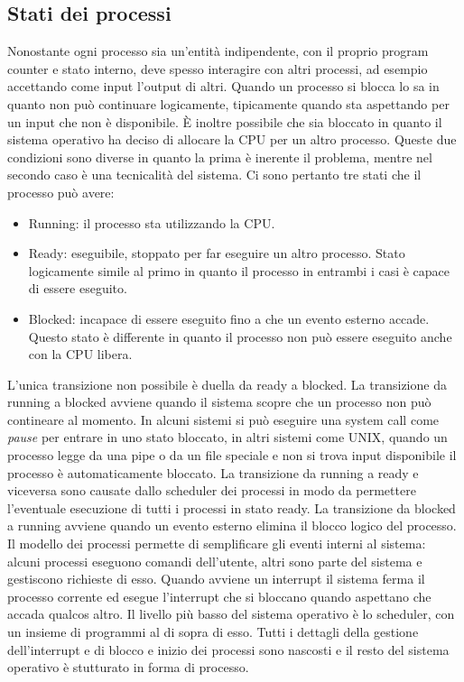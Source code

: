 \subsection{Stati dei processi}
Nonostante ogni processo sia un'entit\`a indipendente, con il proprio program counter e stato interno, deve spesso interagire con altri processi, ad esempio accettando come input 
l'output di altri. Quando un processo si blocca lo sa in quanto non pu\`o continuare logicamente, tipicamente quando sta aspettando per un input che non \`e disponibile. \`E inoltre 
possibile che sia bloccato in quanto il sistema operativo ha deciso di allocare la CPU per un altro processo. Queste due condizioni sono diverse in quanto la prima \`e inerente il 
problema, mentre nel secondo caso \`e una tecnicalit\`a del sistema. Ci sono pertanto tre stati che il processo pu\`o avere:
\begin{itemize}
	\item Running: il processo sta utilizzando la CPU.
	\item Ready: eseguibile, stoppato per far eseguire un altro processo. Stato logicamente simile al primo in quanto il processo in entrambi i casi \`e capace di essere eseguito.
	\item Blocked: incapace di essere eseguito fino a che un evento esterno accade. Questo stato \`e differente in quanto il processo non pu\`o essere eseguito anche con la CPU
		libera.
\end{itemize}
L'unica transizione non possibile \`e duella da ready a blocked. La transizione da running a blocked avviene quando il sistema scopre che un processo non pu\`o contineare al momento. 
In alcuni sistemi si pu\`o eseguire una system call come \emph{pause} per entrare in uno stato bloccato, in altri sistemi come UNIX, quando un processo legge da una pipe o da un file
speciale e non si trova input disponibile il processo \`e automaticamente bloccato. La transizione da running a ready e viceversa sono causate dallo scheduler dei processi in modo da
permettere l'eventuale esecuzione di tutti i processi in stato ready. La transizione da blocked a running avviene quando un evento esterno elimina il blocco logico del processo. 
Il modello dei processi permette di semplificare gli eventi interni al sistema: alcuni processi eseguono comandi dell'utente, altri sono parte del sistema e gestiscono richieste di 
esso. Quando avviene un interrupt il sistema ferma il processo corrente ed esegue l'interrupt che si bloccano quando aspettano che accada qualcos altro. Il livello pi\`u basso del
sistema operativo \`e lo scheduler, con un insieme di programmi al di sopra di esso. Tutti i dettagli della gestione dell'interrupt e di blocco e inizio dei processi sono nascosti e il
resto del sistema operativo \`e stutturato in forma di processo. 
